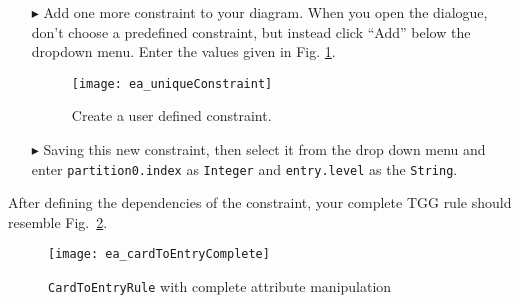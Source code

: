 \begin{enumerate}
\item[$\blacktriangleright$] Add one more constraint to your diagram. When you open the dialogue, don't choose a predefined constraint, but instead click
``Add'' below the dropdown menu. Enter the values given in Fig. \ref{fig:create_new_constraint}.

\vspace{0.5cm}

\begin{figure}[htbp]
\begin{center}
  \texttt{[image: ea\_uniqueConstraint]}
  \caption{Create a user defined constraint.}
  \label{fig:create_new_constraint}
\end{center}
\end{figure}
\FloatBarrier

\item[$\blacktriangleright$] Saving this new constraint, then select it from the drop down menu and enter \texttt{partition0.index} as \texttt{Integer} and
\texttt{entry.level} as the \texttt{String}.
\end{enumerate}

After defining the dependencies of the constraint, your complete TGG rule should resemble Fig.~\ref{fig:cardtoentry_complete}.

\newpage

\begin{figure}[htbp]
\begin{center}
  \texttt{[image: ea\_cardToEntryComplete]}
  \caption{\texttt{CardToEntryRule} with complete attribute manipulation}
  \label{fig:cardtoentry_complete}
\end{center}
\end{figure}


